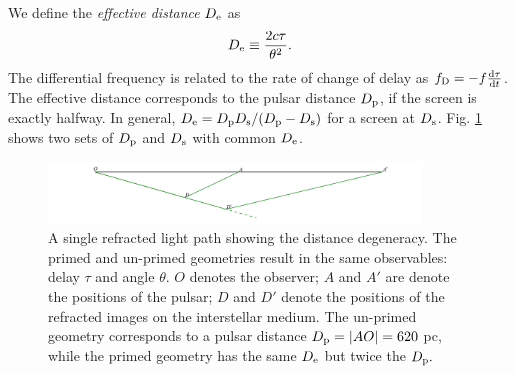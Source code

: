 \documentclass[useAMS,usenatbib]{mn2e}
\begin{document}
We define the {\it effective distance} $D_{\rm e}$ as
\begin{equation}
D_{\rm e} \equiv \frac{2c\tau}{\theta^2}.
\end{equation}
The differential frequency is related to the rate of change of delay
as $f_{\rm D}  =-f\frac{\rm d\tau}{\operatorname{d \!} t}$.  
The effective distance
corresponds to the pulsar distance $D_{\rm p}$, if the screen is exactly halfway.  
In general, $D_{\rm e}={D_{\rm p} D_{\rm s}}/({D_{\rm p} - D_{\rm
    s}})$ for a screen at $D_{\rm s}$.    
Fig. \ref{fig:Singledegeneracy} shows two sets of $D_{\rm p}$ and $D_{\rm s}$ with common $D_{\rm e}$.

\begin{figure}
\centering
\hspace*{-0.4in}\includegraphics[width=3.9in]{single_degeneracy.pdf}
\caption{A single refracted light path showing the distance
  degeneracy.  The primed and un-primed geometries result in the same
  observables: delay $\tau$ and angle $\theta$.
$O$ denotes the observer; $A$ and $A'$ are denote the positions of the
pulsar; $D$ and $D'$ denote the positions of the refracted images on the
interstellar medium. The un-primed geometry corresponds to a pulsar
distance $D_{\rm p} = |AO| = 620$ pc, while the primed geometry has the same $D_{\rm e}$ but twice the
$D_{\rm p}.$}
\label{fig:Singledegeneracy}
\end{figure}


\end{document}
